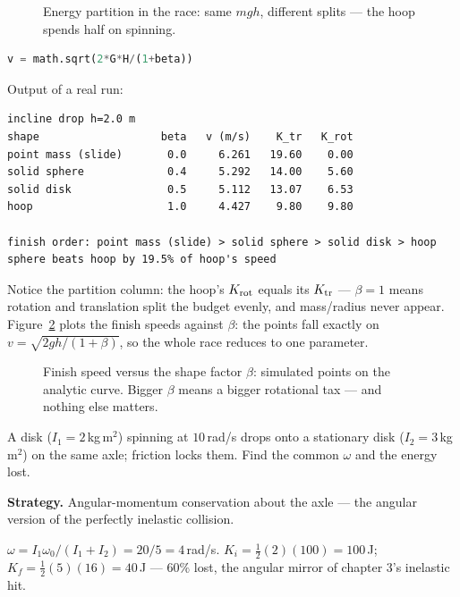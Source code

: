 \begin{figure}[htbp]\centering

\caption{Energy partition in the race: same $mgh$, different splits ---
the hoop spends half on spinning.}
\label{fig:race}
\end{figure}

\begin{lstlisting}[language=Python,caption={\texttt{code/ch06\_rolling\_race.py} --- the incline race for several shape factors.},label={lst:race}]
v = math.sqrt(2*G*H/(1+beta))
\end{lstlisting}

Output of a real run:
\begin{lstlisting}[numbers=none]
incline drop h=2.0 m
shape                   beta   v (m/s)    K_tr   K_rot
point mass (slide)       0.0     6.261   19.60    0.00
solid sphere             0.4     5.292   14.00    5.60
solid disk               0.5     5.112   13.07    6.53
hoop                     1.0     4.427    9.80    9.80

finish order: point mass (slide) > solid sphere > solid disk > hoop
sphere beats hoop by 19.5% of hoop's speed
\end{lstlisting}

Notice the partition column: the hoop's $K_{\rm rot}$ equals its
$K_{\rm tr}$ --- $\beta=1$ means rotation and translation split the
budget evenly, and mass/radius never appear. Figure~\ref{fig:speedbeta}
plots the finish speeds against $\beta$: the points fall exactly on
$v=\sqrt{2gh/(1+\beta)}$, so the whole race reduces to one parameter.

\begin{figure}[htbp]\centering

\caption{Finish speed versus the shape factor $\beta$: simulated points
on the analytic curve. Bigger $\beta$ means a bigger rotational tax ---
and nothing else matters.}
\label{fig:speedbeta}
\end{figure}

\begin{example}\label{ex:twodisk}
A disk ($I_1=2$\,kg\,m$^{2}$) spinning at $10$\,rad/s drops onto a
stationary disk ($I_2=3$\,kg\,m$^{2}$) on the same axle; friction locks
them. Find the common $\omega$ and the energy lost.
\par\smallskip
\textbf{Strategy.} Angular-momentum conservation about the axle --- the
angular version of the perfectly inelastic collision.
\begin{solution}
$\omega=I_1\omega_0/(I_1+I_2)=20/5=4$\,rad/s.
$K_i=\tfrac12(2)(100)=100$\,J;
$K_f=\tfrac12(5)(16)=40$\,J --- $60\%$ lost, the angular mirror of
chapter 3's inelastic hit. \checkmark
\end{solution}
\end{example}

